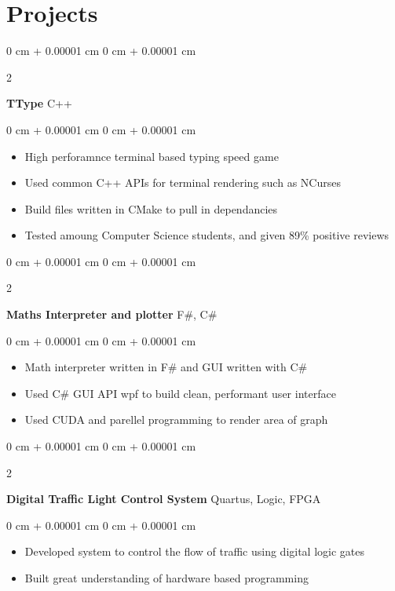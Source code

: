 \documentclass[10pt, letterpaper]{article}
\newenvironment{highlights}{
    \begin{itemize}[
        topsep=0.10 cm,
        parsep=0.10 cm,
        partopsep=0pt,
        itemsep=0pt,
        leftmargin=0 cm + 10pt
    ]
}{
    \end{itemize}
} %
\newenvironment{onecolentry}{
    \begin{adjustwidth}{
        0 cm + 0.00001 cm
    }{
        0 cm + 0.00001 cm
    }
}{
    \end{adjustwidth}
} %
\newenvironment{twocolentry}[2][]{
    \onecolentry
    \def\secondColumn{#2}
    \setcolumnwidth{\fill, 4.5 cm}
    \begin{paracol}{2}
}{
    \switchcolumn \raggedleft \secondColumn
    \end{paracol}
    \endonecolentry
} %
\begin{document}
\section{Projects}

\begin{twocolentry}{
		C++
	}
	\textbf{TType}\end{twocolentry}
\vspace{0.10 cm}
\begin{onecolentry}
	\begin{highlights}
		\item High perforamnce terminal based typing speed game
		\item Used common C++ APIs for terminal rendering such as NCurses
		\item Build files written in CMake to pull in dependancies
		\item Tested amoung Computer Science students, and given 89\% positive reviews
	\end{highlights}
\end{onecolentry}
\vspace{0.2 cm}
\begin{twocolentry}{
		F\#, C\#
	}
	\textbf{Maths Interpreter and plotter}\end{twocolentry}
\vspace{0.10 cm}
\begin{onecolentry}
	\begin{highlights}
		\item Math interpreter written in F\# and GUI written with C\#
		\item Used C\# GUI API wpf to build clean, performant user interface
		\item Used CUDA and parellel programming to render area of graph
	\end{highlights}
\end{onecolentry}

\vspace{0.2 cm}

\begin{twocolentry}{
		Quartus, Logic, FPGA
	}
	\textbf{Digital Traffic Light Control System}\end{twocolentry}
\vspace{0.10 cm}
\begin{onecolentry}
	\begin{highlights}
		\item Developed system to control the flow of traffic using digital logic gates
		\item Built great understanding of hardware based programming
	\end{highlights}
\end{onecolentry}
\end{document}
